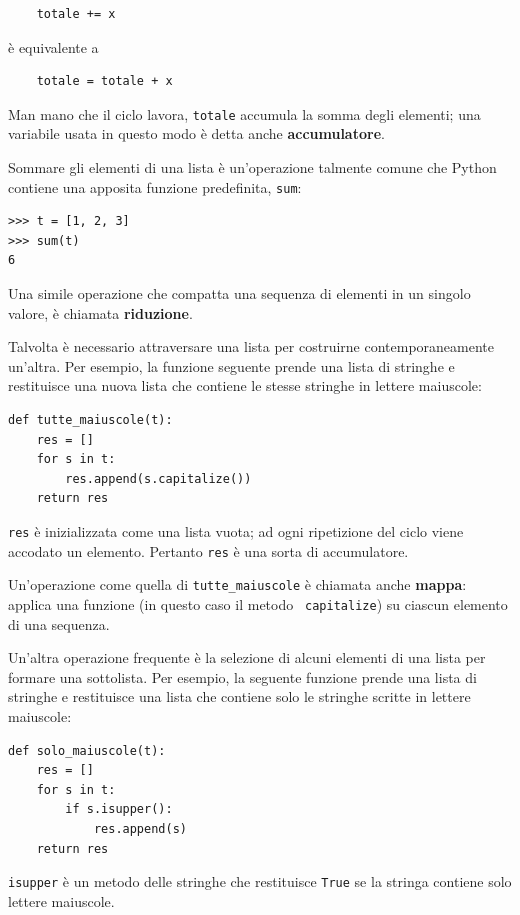 \documentclass[10pt]{book}
\begin{document}
\begin{verbatim}
    totale += x
\end{verbatim}
%
è equivalente a

\begin{verbatim}
    totale = totale + x
\end{verbatim}
%
Man mano che il ciclo lavora, {\tt totale} accumula la somma degli elementi; una variabile usata in questo modo è detta anche {\bf accumulatore}.

Sommare gli elementi di una lista è un'operazione talmente comune che Python contiene una apposita funzione predefinita, {\tt sum}:

\begin{verbatim}
>>> t = [1, 2, 3]
>>> sum(t)
6
\end{verbatim}
%
Una simile operazione che compatta una sequenza di elementi in un singolo valore, è chiamata {\bf riduzione}.

Talvolta è necessario attraversare una lista per costruirne contemporaneamente un'altra. Per esempio, la funzione seguente prende una lista di stringhe e restituisce una nuova lista che contiene le stesse stringhe in lettere maiuscole:

\begin{verbatim}
def tutte_maiuscole(t):
    res = []
    for s in t:
        res.append(s.capitalize())
    return res
\end{verbatim}
%
{\tt res} è inizializzata come una lista vuota; ad ogni ripetizione del ciclo viene accodato un elemento. Pertanto {\tt res} è una sorta di accumulatore.

Un'operazione come quella di \verb"tutte_maiuscole" è chiamata anche {\bf
mappa}: applica una funzione (in questo caso il metodo {\tt
capitalize}) su ciascun elemento di una sequenza.

Un'altra operazione frequente è la selezione di alcuni elementi di una lista per formare una sottolista. Per esempio, la seguente funzione prende una lista di stringhe e restituisce una lista che contiene solo le stringhe scritte in lettere maiuscole:

\begin{verbatim}
def solo_maiuscole(t):
    res = []
    for s in t:
        if s.isupper():
            res.append(s)
    return res
\end{verbatim}
%
{\tt isupper} è un metodo delle stringhe che restituisce {\tt True} se la stringa contiene solo lettere maiuscole.
\end{document}
